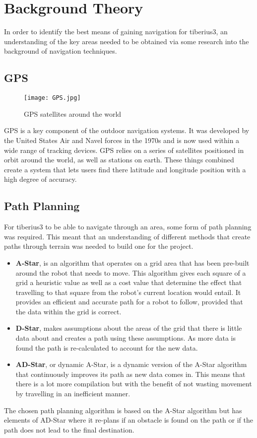 \section{Background Theory}
In order to identify the best means of gaining navigation for \gls{tiberius3}, an understanding of the key areas needed to be obtained via some research into the background of navigation techniques.
\subsection{GPS}

\begin{figure}[!htb]
\begin{center}
\texttt{[image: GPS.jpg]}
\end{center}
\caption{\gls{GPS} satellites around the world\cite{RobotNavigation}}
\label{fig:AGNavigation}
\end{figure}

\gls{GPS} is a key component of the outdoor navigation systems. It was developed by the United States Air and Navel forces in the 1970s and is now used within a wide range of tracking devices. \gls{GPS} relies on a series of satellites positioned in orbit around the world, as well as stations on earth. These things combined create a system that lets users find there latitude and longitude position with a high degree of accuracy.
\subsection{Path Planning}
For \gls{tiberius3} to be able to navigate through an area, some form of path planning was required. This meant that an understanding of different methods that create paths through terrain was needed to build one for the project.

\begin{itemize}
\item \textbf{A-Star}, is an algorithm that operates on a grid area that has been pre-built around the robot that needs to move. This algorithm gives each square of a grid a heuristic value as well as a cost value that determine the effect that travelling to that square from the robot's current location would entail. It provides an efficient and accurate path for a robot to follow, provided that the data within the grid is correct.
\item \textbf{D-Star}, makes assumptions about the areas of the grid that there is little data about and creates a path using these assumptions. As more data is found the path is re-calculated to account for the new data.
\item \textbf{AD-Star}, or dynamic A-Star, is a dynamic version of the A-Star algorithm that continuously improves its path as new data comes in. This means that there is a lot more compilation but with the benefit of not wasting movement by travelling in an inefficient manner.
\end{itemize}
The chosen path planning algorithm is based on the A-Star algorithm but has elements of AD-Star where it re-plans if an obstacle is found on the path or if the path does not lead to the final destination.

